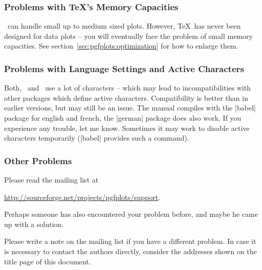 \subsubsection{Problems with \TeX's Memory Capacities}
\PGFPlots\ can handle small up to medium sized plots. However, \TeX\ has never been designed for data plots -- you will eventually face the problem of small memory capacities. See section~\ref{sec:pgfplots:optimization} for how to enlarge them.

\subsubsection{Problems with Language Settings and Active Characters}
Both, \PGF\ and \PGFPlots\ use a lot of characters -- which may lead to incompatibilities with other packages which define active characters. Compatibility is better than in earlier versions, but may still be an issue. The manual compiles with the |babel| package for english and french, the |german| package does also work. If you experience any trouble, let me know. Sometimes it may work to disable active characters temporarily (|babel| provides such a command).

\subsubsection{Other Problems}
Please read the mailing list at

\url{http://sourceforge.net/projects/pgfplots/support}.

\noindent Perhaps someone has also encountered your problem before, and maybe he came up with a solution.

Please write a note on the mailing list if you have a different problem. In case it is necessary to contact the authors directly, consider the addresses shown on the title page of this document.
